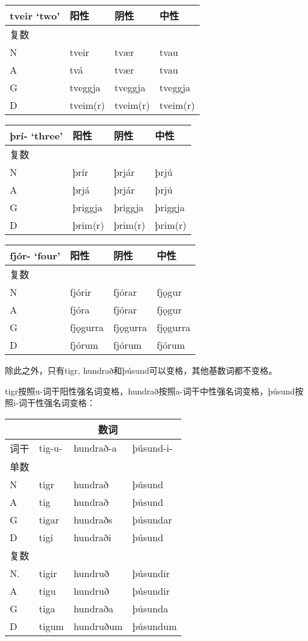 \begin{longtable}{llll}
\toprule
tveir `two‌' & 阳性 & 阴性 & 中性 \\
\midrule
\endhead
\bottomrule
\endfoot
复数 & & & \\
N & tveir & tvær & tvau \\
A & tvá & tvær & tvau \\
G & tveggja & tveggja & tveggja \\
D & tveim(r) & tveim(r) & tveim(r) \\
\end{longtable}

\begin{longtable}{llll}
\toprule
þrí- `three‌' & 阳性 & 阴性 & 中性 \\
\midrule
\endhead
\bottomrule
\endfoot
复数 & & & \\
N & þrír & þrjár & þrjú \\
A & þrjá & þrjár & þrjú \\
G & þriggja & þriggja & þriggja \\
D & þrim(r) & þrim(r) & þrim(r) \\
\end{longtable}

\begin{longtable}{llll}
\toprule
fjór- `four‌' & 阳性 & 阴性 & 中性 \\
\midrule
\endhead
\bottomrule
\endfoot
复数 & & & \\
N & fjórir & fjórar & fjǫgur \\
A & fjóra & fjórar & fjǫgur \\
G & fjǫgurra & fjǫgurra & fjǫgurra \\
D & fjórum & fjórum & fjórum \\
\end{longtable}

除此之外，只有tigr, hundrað和þúsund可以变格，其他基数词都不变格。

tigr按照u-词干阳性强名词变格，hundrað按照a-词干中性强名词变格，þúsund按照i-词干性强名词变格：

\begin{longtable}{llll}
\toprule
 &\multicolumn{3}{c}{数词} \\
\midrule
\endhead
\bottomrule
\endfoot
词干 & tig-u- & hundrað-a & þúsund-i- \\
单数 & & & \\
N & tigr & hundrað & þúsund \\
A & tig & hundrað & þúsund \\
G & tigar & hundraðs & þúsundar \\
D & tigi & hundraði & þúsund \\
复数 & & & \\
N. & tigir & hundruð & þúsundir \\
A & tigu & hundruð & þúsundir \\
G & tiga & hundraða & þúsunda \\
D & tigum & hundruðum & þúsundum \\
\end{longtable}

